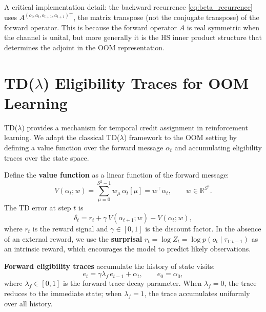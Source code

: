 A critical implementation detail: the backward recurrence
\eqref{eq:beta_recurrence} uses $A^{(o_t,a_t,o_{t+1},a_{t+1})\top}$, the
matrix transpose (not the conjugate transpose) of the forward operator.
This is because the forward operator $A$ is real symmetric when the
channel is unital, but more generally it is the HS inner product structure
that determines the adjoint in the OOM representation.


\section{TD($\lambda$) Eligibility Traces for OOM Learning}
\label{sec:td_lambda}

TD($\lambda$) \citep{sutton1988learning, sutton2000review} provides a
mechanism for temporal credit assignment in reinforcement learning. We
adapt the classical TD($\lambda$) framework to the OOM setting by defining
a value function over the forward message $\alpha_t$ and accumulating
eligibility traces over the state space.


Define the \textbf{value function} as a linear function of the forward
message:
\begin{equation}
V(\alpha_t; w) = \sum_{\mu=0}^{S^2-1} w_\mu \, \alpha_t[\mu] = w^\top \alpha_t,
\qquad w \in \mathbb{R}^{S^2}.
\label{eq:value_function}
\end{equation}
The TD error at step $t$ is
\begin{equation}
\delta_t = r_t + \gamma \, V(\alpha_{t+1}; w) - V(\alpha_t; w),
\label{eq:td_error}
\end{equation}
where $r_t$ is the reward signal and $\gamma \in [0,1]$ is the discount
factor. In the absence of an external reward, we use the
\textbf{surprisal} $r_t = \log Z_t = \log p(o_t \mid \tau_{1:t-1})$ as an
intrinsic reward, which encourages the model to predict likely observations.


\textbf{Forward eligibility traces} accumulate the history of state
visits:
\begin{equation}
e_t = \gamma \lambda_f \, e_{t-1} + \alpha_t,
\qquad e_0 = \alpha_0,
\label{eq:forward_trace}
\end{equation}
where $\lambda_f \in [0,1]$ is the forward trace decay parameter. When
$\lambda_f = 0$, the trace reduces to the immediate state; when
$\lambda_f = 1$, the trace accumulates uniformly over all history.

